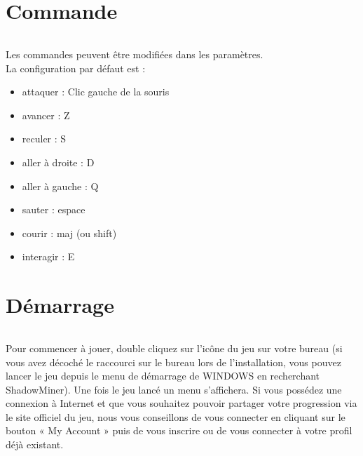 \documentclass[titlepage, 13px, a4paper]{report}
\begin{document}

\newpage


\part{Commande} 
\paragraph*{} \hspace{0pt}
Les commandes peuvent être modifiées dans les paramètres. \\ La configuration par défaut est : \\
{\begin{itemize}
	\item attaquer : Clic gauche de la souris
	\item avancer : Z
	\item reculer : S
	\item aller à droite : D
	\item aller à gauche : Q
	\item sauter : espace
	\item courir : maj (ou shift)
	\item interagir :  E \\
\end{itemize}}


\newpage


\part{Démarrage}
\paragraph*{} \hspace{0pt}
Pour commencer à jouer, double cliquez sur l’icône du jeu sur votre bureau (si vous avez décoché le raccourci sur 
le bureau lors de l'installation, vous pouvez lancer le jeu depuis le menu de démarrage de WINDOWS en recherchant ShadowMiner). 
Une fois le jeu lancé un menu s'affichera. Si vous possédez une connexion à Internet et que vous souhaitez pouvoir 
partager votre progression via le site officiel du jeu, nous vous conseillons de vous connecter en cliquant sur le 
bouton « My Account » puis de vous inscrire ou de vous connecter à votre profil déjà existant. \\
\end{document}
